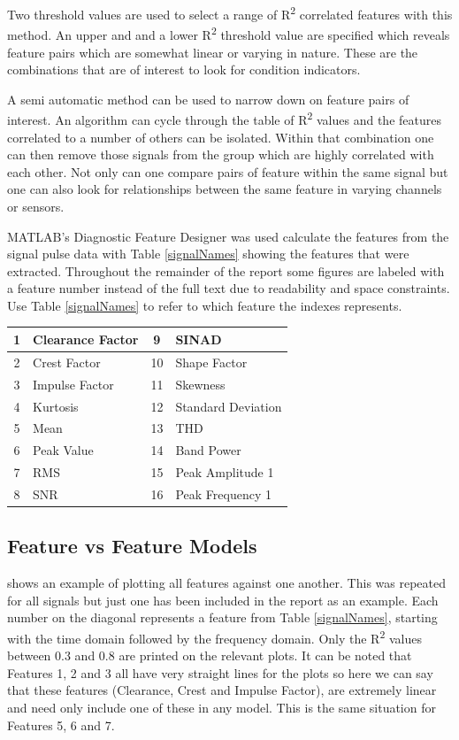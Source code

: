 \documentclass[]{article}
\begin{document}
Two threshold values are used to select a range of R\textsuperscript{2} correlated features with this method. An upper and and a lower R\textsuperscript{2} threshold value are specified which reveals feature pairs which are somewhat linear or varying in nature. These are the combinations that are of interest to look for condition indicators.

A semi automatic method can be used to narrow down on feature pairs of interest. An algorithm can cycle through the table of R\textsuperscript{2} values and the features correlated to a number of others can be isolated. Within that combination one can then remove those signals from the group which are highly correlated with each other. Not only can one compare pairs of feature within the same signal but one can also look for relationships between the same feature in varying channels or sensors. 

MATLAB's Diagnostic Feature Designer was used calculate the features from the signal pulse data with Table \ref{signalNames} showing the features that were extracted. Throughout the remainder of the report some figures are labeled with a feature number instead of the full text due to readability and space constraints. Use Table \ref{signalNames} to refer to which feature the indexes represents.

\begin{center}
\label{featureNames}
\begin{tabular}{ |c|l|c|l| }
 \hline
 1 & Clearance Factor & 9 & \gls{SINAD}\\
 \hline
 2 & Crest Factor & 10 & Shape Factor\\
 \hline
 3 & Impulse Factor & 11 & Skewness\\
 \hline
 4 & Kurtosis & 12 & Standard Deviation\\
 \hline
 5 & Mean & 13 & \gls{THD}\\
 \hline
 6 & Peak Value &  14 & Band Power \\
 \hline
 7 & \gls{RMS} & 15 & Peak Amplitude 1\\ 
 \hline              
 8 & \gls{SNR} & 16 & Peak Frequency 1 \\
 \hline        
\end{tabular}
\end{center}

\subsection{Feature vs Feature Models}
 shows an example of plotting all features against one another. This was repeated for all signals but just one has been included in the report as an example. Each number on the diagonal represents a feature from Table \ref{signalNames}, starting with the time domain followed by the frequency domain. Only the R\textsuperscript{2} values between 0.3 and 0.8 are printed on the relevant plots. It can be noted that Features 1, 2 and 3 all have very straight lines for the plots so here we can say that these features (Clearance, Crest and Impulse Factor), are extremely linear and need only include one of these in any model. This is the same situation for Features 5, 6 and 7.
\end{document}
